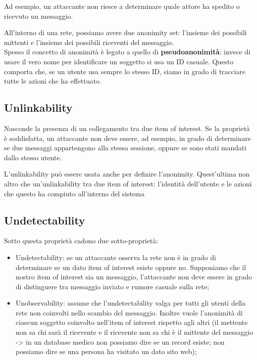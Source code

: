 Ad esempio, un attaccante non riesce a determinare quale attore ha spedito o ricevuto un messaggio.

All'interno di una rete, possiamo avere due anonimity set: l'insieme dei possibili mittenti e l'insieme dei possibili riceventi del messaggio. 
\\

\noindent Spesso il concetto di anonimità è legato a quello di \textbf{pseudoanonimità}: invece di usare il vero nome per identificare un soggetto si usa un ID casuale. Questo comporta che, se un utente usa sempre lo stesso ID, siamo in grado di tracciare tutte le azioni che ha effettuato.

\subsection{Unlinkability}
Nasconde la presenza di un collegamento tra due item of interest. Se la proprietà è soddisfatta, un attaccante non deve essere, ad esempio, in grado di determinare se due messaggi appartengono alla stessa sessione, oppure se sono stati mandati dallo stesso utente.

L'unlinkability può essere usata anche per definire l'anonimity. Quest'ultima non  altro che un'unlinkability tra due item of interest: l'identità dell'utente e le azioni che questo ha compiuto all'interno del sistema

\subsection{Undetectability}
Sotto questa proprietà cadono due sotto-proprietà:
\begin{itemize}
    \item Undetectability: se un attaccante osserva la rete non è in grado di determinare se un dato item of interest esiste oppure no. Supponiamo che il nostro item of interest sia un messaggio, l'attaccante non deve essere in grado di distinguere tra messaggio inviato e rumore casuale sulla rete;
    \item Unobservability: assume che l'undetectability valga per tutti gli utenti della rete non coinvolti nello scambio del messaggio. Inoltre vuole l'anonimità di ciascun soggetto coinvolto nell'item of interest rispetto agli altri (il mettente non sa chi sarà il ricevente e il ricevente non sa chi è il mittente del messaggio -> in un database medico non possiamo dire se un record esiste; non possiamo dire se una persona ha visitato un dato sito web);
\end{itemize}

